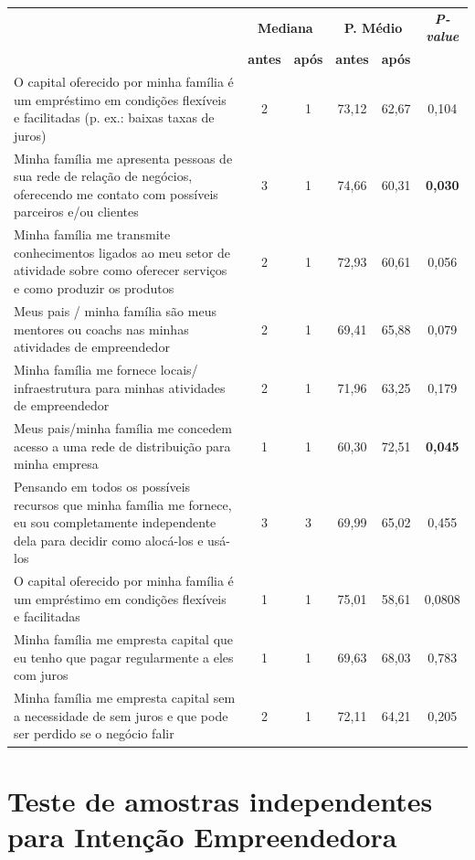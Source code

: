 \begin{apendicesenv}
\begin{longtable}[!h]{p{7cm}ccccc}
\endlastfoot
%
\multicolumn{1}{c}{\textbf{Teste de amostras independentes}} &
  \multicolumn{2}{c}{\textbf{Mediana}} &
  \multicolumn{2}{c}{\textbf{P. Médio}} &
  \multicolumn{1}{c}{\textbf{\textit{P-value}}} \\ \cline{2-5}
 &
  \textbf{antes} &
  \multicolumn{1}{l}{\textbf{após}} &
  \textbf{antes} &
  \textbf{após} &
  \multicolumn{1}{l}{} \\ \hline
O capital oferecido por minha família é um empréstimo em condições flexíveis e facilitadas (p. ex.: baixas taxas de juros) &
  2 &
  1 &
  73,12 &
  62,67 &
    0,104 \\
Minha família me apresenta pessoas de sua rede de relação de negócios, oferecendo me contato com possíveis parceiros e/ou clientes &
  3 &
  1 &
  74,66 &
  60,31 &
 \textbf{0,030} \\
Minha família me transmite conhecimentos ligados ao meu setor de atividade sobre como oferecer serviços e como produzir os produtos &
  2 &
  1 &
  72,93 &
  60,61 &
  0,056 \\
Meus pais / minha família são meus mentores ou coachs nas minhas atividades de empreendedor &
  2 &
  1 &
  69,41 &
  65,88 &
  0,079 \\
Minha família me fornece locais/ infraestrutura para minhas atividades de empreendedor &
  2 &
  1 &
  71,96 &
  63,25 &
  0,179 \\
Meus pais/minha família me concedem acesso a uma rede de distribuição para minha empresa &
  1 &
  1 &
  60,30 &
  72,51 &
  \textbf{0,045} \\
Pensando em todos os possíveis recursos que minha família me fornece, eu sou completamente independente dela para decidir como alocá-los e usá-los &
  3 &
  3 &
  69,99 &
  65,02 &
  0,455 \\
O capital oferecido por minha família é um empréstimo em condições flexíveis e facilitadas &
  1 &
  1 &
  75,01 &
  58,61 &
  0,0808 \\
Minha família me empresta capital que eu tenho que pagar regularmente a eles com juros &
  1 &
  1 &
  69,63 &
  68,03 &
  0,783 \\
Minha família me empresta capital sem a necessidade de sem juros e que pode ser perdido se o negócio falir &
  2 &
  1 &
  72,11 &
  64,21 &
  0,205  \\ \hline \hline
\end{longtable}



\chapter{Teste de amostras independentes para Intenção Empreendedora}
\label{tab:amostras_intencao_empreendedora}



\end{apendicesenv}
